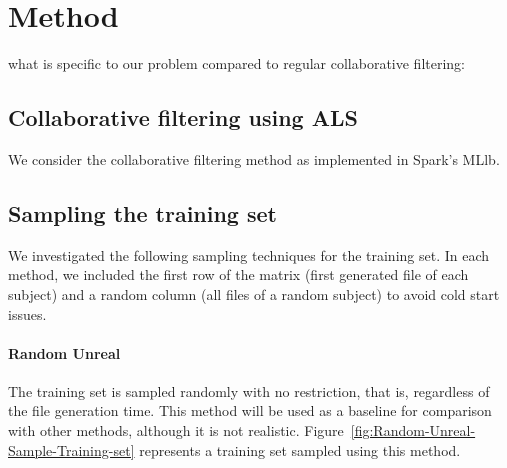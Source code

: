 \documentclass[10pt, conference, compsocconf]{IEEEtran}
\begin{document}





\section{Method}

what is specific to our problem compared to regular collaborative filtering:

\subsection{Collaborative filtering using ALS}

We consider the collaborative filtering method as implemented in Spark's MLlb.




\subsection{Sampling the training set}

We investigated the following sampling techniques for the training set. 
In each method, we included the first row of the matrix (first 
generated file of each subject) and a random column (all files of a 
random subject) to avoid cold start issues. 

\paragraph{Random Unreal}
The training set is sampled randomly with no restriction, that is,
regardless of the file generation time. This method will be used as a
baseline for comparison with other methods, although it is not
realistic. Figure~\ref{fig:Random-Unreal-Sample-Training-set} represents 
a training set sampled using this method.
\end{document}
